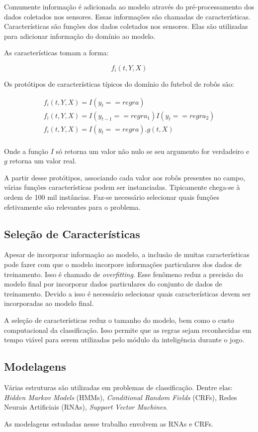 Comumente informação é adicionada ao modelo através do pré-processamento dos
dados coletados nos sensores. Essas informações são chamadas de características.
Características são funções dos dados coletados nos sensores. Elas são utilizadas
para adicionar informação do domínio ao modelo.

As características tomam a forma:

\begin{centering}
\begin{equation}
f_i(t,Y,X)
\end{equation}
\end{centering}

Os protótipos de características típicos do domínio do futebol de robôs são:

\begin{centering}
\begin{eqnarray}
f_i(t,Y,X)=I(y_t == regra)\\
f_i(t,Y,X)=I(y_{t-1} == regra_1)I(y_t == regra_2)\\
f_i(t,Y,X)=I(y_t == regra).g(t,X)\\
\end{eqnarray}
\end{centering}

Onde a função $I$ só retorna um valor não nulo se seu argumento for verdadeiro e
$g$ retorna um valor real.

A partir desse protótipos, associando cada valor aos robôs presentes
no campo, várias funções características podem ser instanciadas.
Tipicamente chega-se à ordem de 100 mil instâncias. Faz-se necessário
selecionar quais funções efetivamente são relevantes para o problema.

\subsection{Seleção de Características}

Apesar de incorporar informação ao modelo, a inclusão de muitas características
pode fazer com que o modelo incorpore informações particulares dos dados de
treinamento. Isso é chamado de \textit{overfitting}. Esse fenômeno reduz a precisão
do modelo final por incorporar dados particulares do conjunto de dados de
treinamento. Devido a isso é necessário selecionar quais características devem
ser incorporadas ao modelo final.

A seleção de características reduz o tamanho do modelo, bem como o custo
computacional da classificação. Isso permite que as regras sejam reconhecidas
em tempo viável para serem utilizadas pelo módulo da inteligência durante o
jogo.

\subsection{Modelagens}

Várias estruturas são utilizadas em problemas de classificação. Dentre elas:
\textit{Hidden Markov Models} (HMMs), \textit{Conditional Random Fields} (CRFs),
Redes Neurais Artificiais (RNAs), \textit{Support Vector Machines}.

As modelagens estudadas nesse trabalho envolvem as RNAs e CRFs.
